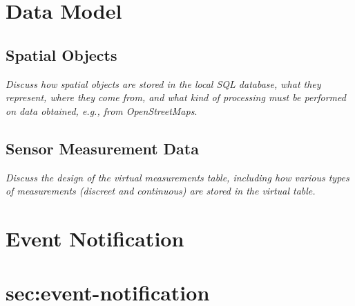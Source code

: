 \documentclass[conference,10pt]{IEEEtran}
\begin{document}
\section{Data Model}
\label{sec:data-model}

\subsection{Spatial Objects}
\label{sec:spatial-objects}

\textit{Discuss how spatial objects are stored in the local SQL database, what they represent, where they come from, and what kind of processing  must be performed on data obtained, e.g., from OpenStreetMaps}.

\subsection{Sensor Measurement Data}
\label{sec:sensor-measurements}

\textit{Discuss the design of the virtual measurements table, including how various types of measurements (discreet and continuous) are stored in the virtual table.}

\section{Event Notification}
\section{sec:event-notification}



\end{document}
